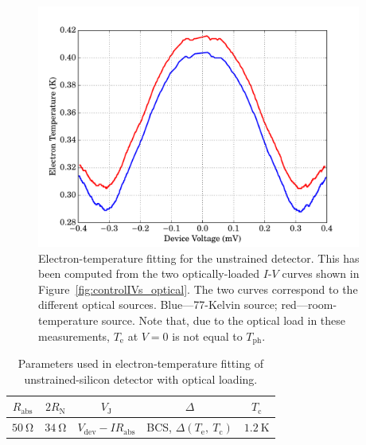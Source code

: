 \begin{figure}[tb]
\begin{center}
\includegraphics[width = 0.95\textwidth]{figures/control_Te_77_300}
\caption[Electron temperature for an optically-loaded unstrained SiCEB]{Electron-temperature fitting for the unstrained detector. This has been computed from the two optically-loaded $I$-$V$ curves shown in Figure~\ref{fig:controlIVs_optical}. The two curves correspond to the different optical sources. Blue---77-Kelvin source; red---room-temperature source. Note that, due to the optical load in these measurements, $T_{\mathrm{e}}$ at $V = 0$ is not equal to $T_{\mathrm{ph}}$.}
\label{fig:controlTe_optical}
\end{center}
\end{figure}
\begin{table}[htb]
\caption[Parameters used in electron-temperature fitting of unstrained-silicon detector with optical loading]{Parameters used in electron-temperature fitting of unstrained-silicon detector with optical loading.} 
\label{tab:ControlTeParams_optical}
\centering
\begin{tabular}{ccccc}
\toprule\toprule
$R_{\mathrm{abs}}$ & $2R_{\mathrm{N}}$ & $V_{\mathrm{J}}$ & $\varDelta$ & $T_{\mathrm{c}}$ \\ \midrule
$50~\mathrm{\Omega}$ & $34~\mathrm{\Omega}$ & $V_{\mathrm{dev}} - IR_{\mathrm{abs}}$ 
& BCS, $\varDelta\left(T_{\mathrm{e}},~T_{\mathrm{c}}\right)$ & $1.2~\mathrm{K}$ \\
\bottomrule
\end{tabular}
\end{table}
\par 
